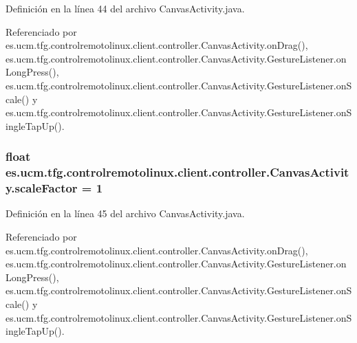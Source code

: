 Definición en la línea 44 del archivo Canvas\-Activity.\-java.



Referenciado por es.\-ucm.\-tfg.\-controlremotolinux.\-client.\-controller.\-Canvas\-Activity.\-on\-Drag(), es.\-ucm.\-tfg.\-controlremotolinux.\-client.\-controller.\-Canvas\-Activity.\-Gesture\-Listener.\-on\-Long\-Press(), es.\-ucm.\-tfg.\-controlremotolinux.\-client.\-controller.\-Canvas\-Activity.\-Gesture\-Listener.\-on\-Scale() y es.\-ucm.\-tfg.\-controlremotolinux.\-client.\-controller.\-Canvas\-Activity.\-Gesture\-Listener.\-on\-Single\-Tap\-Up().

\hypertarget{classes_1_1ucm_1_1tfg_1_1controlremotolinux_1_1client_1_1controller_1_1CanvasActivity_aa0192b9a1f96c69dc102fb49edc9f590}{
\subsubsection[{scale\-Factor}]{\setlength{\rightskip}{0pt plus 5cm}float es.\-ucm.\-tfg.\-controlremotolinux.\-client.\-controller.\-Canvas\-Activity.\-scale\-Factor = 1\hspace{0.3cm}{\ttfamily [private]}}}\label{classes_1_1ucm_1_1tfg_1_1controlremotolinux_1_1client_1_1controller_1_1CanvasActivity_aa0192b9a1f96c69dc102fb49edc9f590}


Definición en la línea 45 del archivo Canvas\-Activity.\-java.



Referenciado por es.\-ucm.\-tfg.\-controlremotolinux.\-client.\-controller.\-Canvas\-Activity.\-on\-Drag(), es.\-ucm.\-tfg.\-controlremotolinux.\-client.\-controller.\-Canvas\-Activity.\-Gesture\-Listener.\-on\-Long\-Press(), es.\-ucm.\-tfg.\-controlremotolinux.\-client.\-controller.\-Canvas\-Activity.\-Gesture\-Listener.\-on\-Scale() y es.\-ucm.\-tfg.\-controlremotolinux.\-client.\-controller.\-Canvas\-Activity.\-Gesture\-Listener.\-on\-Single\-Tap\-Up().

